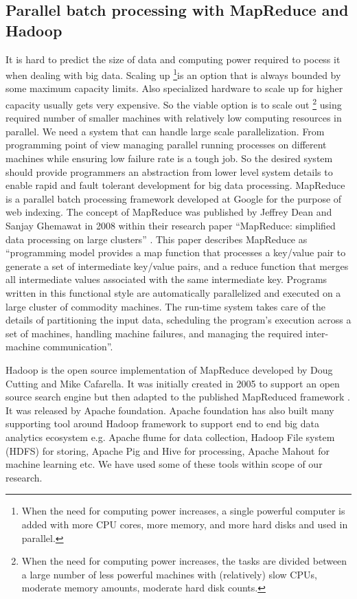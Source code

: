 \subsection{Parallel batch processing with MapReduce and Hadoop} \label{mapr} 
It is hard to predict the size of data and computing power required to pocess it when dealing with big data. Scaling up \footnote{When the need for computing power increases, a single powerful computer is added with more CPU cores, more memory, and more hard disks and used in parallel.}is an option that is always bounded by some maximum capacity limits. Also specialized hardware to scale up for higher capacity usually gets very expensive. So the viable option is to scale out \footnote{When the need for computing power increases, the tasks are divided between a large number of less powerful machines with (relatively) slow CPUs, moderate memory amounts, moderate hard disk counts.} using required number of smaller machines with relatively low computing resources in parallel. We need a system that can handle large scale parallelization. From programming point of view managing parallel running processes on different machines while ensuring low failure rate is a tough job. So the desired system should provide programmers an abstraction from lower level system details to enable rapid and fault tolerant development for big data processing.  MapReduce is a parallel batch processing framework developed at Google for the purpose of web indexing. The concept of MapReduce was published by Jeffrey Dean and Sanjay Ghemawat in 2008 within their research paper ``MapReduce: simplified data processing on large clusters''  \cite{dean2008mapreduce}. This paper describes MapReduce as ``programming model provides a map function that processes a key/value pair to generate a set of intermediate key/value pairs, and a reduce function that merges all intermediate values associated with the same intermediate key. Programs written in this functional style are automatically parallelized and executed on a large cluster of commodity machines. The run-time system takes care of the details of partitioning the input data, scheduling the program's execution across a set of machines, handling machine failures, and managing the required inter-machine communication''.

Hadoop is the open source implementation of MapReduce developed by Doug Cutting and Mike Cafarella. It was initially created in 2005 to support an open source search engine but then adapted to the published MapReduced framework \cite{dean2008mapreduce}. It was released by Apache foundation. Apache foundation has also built many supporting tool around Hadoop framework to support end to end big data analytics ecosystem e.g. Apache flume for data collection, Hadoop File system (HDFS) for storing, Apache Pig and Hive for processing, Apache Mahout for machine learning etc. We have used some of these tools within scope of our research. 

